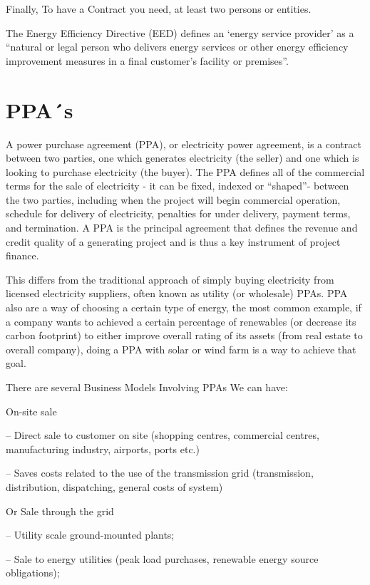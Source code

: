 \documentclass[]{book}
\theoremstyle{definition}
\theoremstyle{definition}
\theoremstyle{definition}
\theoremstyle{remark}
\begin{document}
Finally, To have a Contract you need, at least two persons or entities.

The Energy Efficiency Directive (EED) defines an `energy service
provider' as a ``natural or legal person who delivers energy services or
other energy efficiency improvement measures in a final customer's
facility or premises''.

\section{PPA´s}\label{ppas}

A power purchase agreement (PPA), or electricity power agreement, is a
contract between two parties, one which generates electricity (the
seller) and one which is looking to purchase electricity (the buyer).
The PPA defines all of the commercial terms for the sale of electricity
- it can be fixed, indexed or ``shaped''- between the two parties,
including when the project will begin commercial operation, schedule for
delivery of electricity, penalties for under delivery, payment terms,
and termination. A PPA is the principal agreement that defines the
revenue and credit quality of a generating project and is thus a key
instrument of project finance.

This differs from the traditional approach of simply buying electricity
from licensed electricity suppliers, often known as utility (or
wholesale) PPAs. PPA also are a way of choosing a certain type of
energy, the most common example, if a company wants to achieved a
certain percentage of renewables (or decrease its carbon footprint) to
either improve overall rating of its assets (from real estate to overall
company), doing a PPA with solar or wind farm is a way to achieve that
goal.

There are several Business Models Involving PPAs We can have:

On-site sale

-- Direct sale to customer on site (shopping centres, commercial
centres, manufacturing industry, airports, ports etc.)

-- Saves costs related to the use of the transmission grid
(transmission, distribution, dispatching, general costs of system)

Or Sale through the grid

-- Utility scale ground-mounted plants;

-- Sale to energy utilities (peak load purchases, renewable energy
source obligations);
\end{document}
